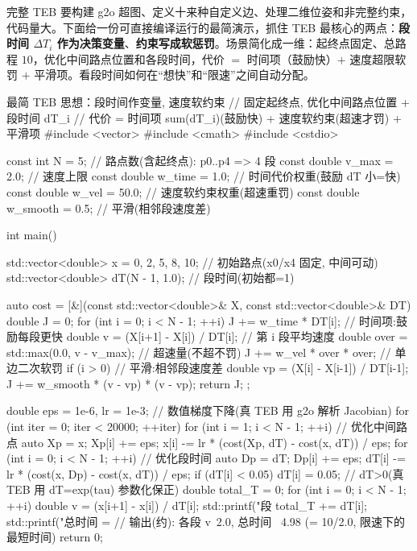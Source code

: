 完整 TEB 要构建 g2o 超图、定义十来种自定义边、处理二维位姿和非完整约束，代码量大。下面给一份可直接编译运行的最简演示，抓住 TEB 最核心的两点：\textbf{段时间 $\Delta T_i$ 作为决策变量}、\textbf{约束写成软惩罚}。场景简化成一维：起终点固定、总路程 $10$，优化中间路点位置和各段时间，代价 $=$ 时间项（鼓励快）$+$ 速度超限软罚 $+$ 平滑项。看段时间如何在“想快”和“限速”之间自动分配。

\begin{codebox}[C++]{最简 TEB 思想：段时间作变量, 速度软约束}
// 固定起终点, 优化中间路点位置 + 段时间 dT_i
// 代价 = 时间项 sum(dT_i)(鼓励快) + 速度软约束(超速才罚) + 平滑项
#include <vector>
#include <cmath>
#include <cstdio>

const int    N        = 5;      // 路点数(含起终点): p0..p4 => 4 段
const double v_max    = 2.0;    // 速度上限
const double w_time   = 1.0;    // 时间代价权重(鼓励 dT 小=快)
const double w_vel    = 50.0;   // 速度软约束权重(超速重罚)
const double w_smooth = 0.5;    // 平滑(相邻段速度差)

int main() {
  std::vector<double> x  = {0, 2, 5, 8, 10};   // 初始路点(x0/x4 固定, 中间可动)
  std::vector<double> dT(N - 1, 1.0);          // 段时间(初始都=1)

  auto cost = [&](const std::vector<double>& X, const std::vector<double>& DT) {
    double J = 0;
    for (int i = 0; i < N - 1; ++i) {
      J += w_time * DT[i];                                   // 时间项:鼓励每段更快
      double v = (X[i+1] - X[i]) / DT[i];                    // 第 i 段平均速度
      double over = std::max(0.0, v - v_max);                // 超速量(不超不罚)
      J += w_vel * over * over;                              // 单边二次软罚
      if (i > 0) {                                           // 平滑:相邻段速度差
        double vp = (X[i] - X[i-1]) / DT[i-1];
        J += w_smooth * (v - vp) * (v - vp);
      }
    }
    return J;
  };

  double eps = 1e-6, lr = 1e-3;                 // 数值梯度下降(真 TEB 用 g2o 解析 Jacobian)
  for (int iter = 0; iter < 20000; ++iter) {
    for (int i = 1; i < N - 1; ++i) {                        // 优化中间路点
      auto Xp = x; Xp[i] += eps;
      x[i] -= lr * (cost(Xp, dT) - cost(x, dT)) / eps;
    }
    for (int i = 0; i < N - 1; ++i) {                        // 优化段时间
      auto Dp = dT; Dp[i] += eps;
      dT[i] -= lr * (cost(x, Dp) - cost(x, dT)) / eps;
      if (dT[i] < 0.05) dT[i] = 0.05;          // dT>0(真 TEB 用 dT=exp(tau) 参数化保正)
    }
  }
  double total_T = 0;
  for (int i = 0; i < N - 1; ++i) {
    double v = (x[i+1] - x[i]) / dT[i];
    std::printf("段%
    total_T += dT[i];
  }
  std::printf("总时间 = %
  // 输出(约): 各段 v~2.0, 总时间 ~4.98 (= 10/2.0, 限速下的最短时间)
  return 0;
}
\end{codebox}

